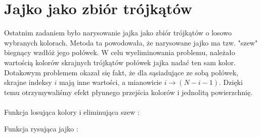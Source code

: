 \documentclass[wide,a4paper,titlepage,12pt] {article}
\begin{document}
\section{Jajko jako zbiór trójkątów}
Ostatnim zadaniem było narysowanie jajka jako zbiór trójkątów o losowo wybranych kolorach. Metoda ta powodowała, że narysowane jajko ma tzw. "szew" biegnący wzdłóż jego połówek. W celu wyeliminowania problemu, należało wartością kolorów skrajnych trójkątów połówek jajka nadać ten sam kolor. Dotakowym problemem okazał się fakt, że dla sąsiadujące ze sobą połówek, skrajne indeksy $i$ mają inne wartości, a mianowicie $i \rightarrow( N-i-1)$. Dzięki temu otrzymywaliśmy efekt płynnego przejścia kolorów i jednolitą powierzchnię.\\ \\
Funkcja losująca kolory i eliminująca szew : 
\lstset{ %
    language=c++,                %
    basicstyle=\scriptsize,       %
    numbers=left,                   %
    numberstyle=\scriptsize,      %
    stepnumber=10,                   %
    numbersep=9pt,                  %
    showspaces=false,               %
    showstringspaces=false,         %
    showtabs=false,                 %
    breaklines=true,                %
    }
    
 Funkcja rysująca jajko : 
\end{document}
